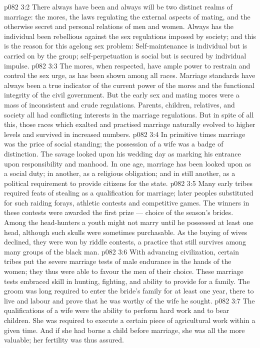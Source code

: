 \vs p082 3:2 There always have been and always will be two distinct realms of marriage: the mores, the laws regulating the external aspects of mating, and the otherwise secret and personal relations of men and women. Always has the individual been rebellious against the sex regulations imposed by society; and this is the reason for this agelong sex problem: Self\hyp{}maintenance is individual but is carried on by the group; self\hyp{}perpetuation is social but is secured by individual impulse.
\vs p082 3:3 The mores, when respected, have ample power to restrain and control the sex urge, as has been shown among all races. Marriage standards have always been a true indicator of the current power of the mores and the functional integrity of the civil government. But the early sex and mating mores were a mass of inconsistent and crude regulations. Parents, children, relatives, and society all had conflicting interests in the marriage regulations. But in spite of all this, those races which exalted and practised marriage naturally evolved to higher levels and survived in increased numbers.
\vs p082 3:4 \pc In primitive times marriage was the price of social standing; the possession of a wife was a badge of distinction. The savage looked upon his wedding day as marking his entrance upon responsibility and manhood. In one age, marriage has been looked upon as a social duty; in another, as a religious obligation; and in still another, as a political requirement to provide citizens for the state.
\vs p082 3:5 Many early tribes required feats of stealing as a qualification for marriage; later peoples substituted for such raiding forays, athletic contests and competitive games. The winners in these contests were awarded the first prize --- choice of the season’s brides. Among the head\hyp{}hunters a youth might not marry until he possessed at least one head, although such skulls were sometimes purchasable. As the buying of wives declined, they were won by riddle contests, a practice that still survives among many groups of the black man.
\vs p082 3:6 With advancing civilization, certain tribes put the severe marriage tests of male endurance in the hands of the women; they thus were able to favour the men of their choice. These marriage tests embraced skill in hunting, fighting, and ability to provide for a family. The groom was long required to enter the bride’s family for at least one year, there to live and labour and prove that he was worthy of the wife he sought.
\vs p082 3:7 The qualifications of a wife were the ability to perform hard work and to bear children. She was required to execute a certain piece of agricultural work within a given time. And if she had borne a child before marriage, she was all the more valuable; her fertility was thus assured.
